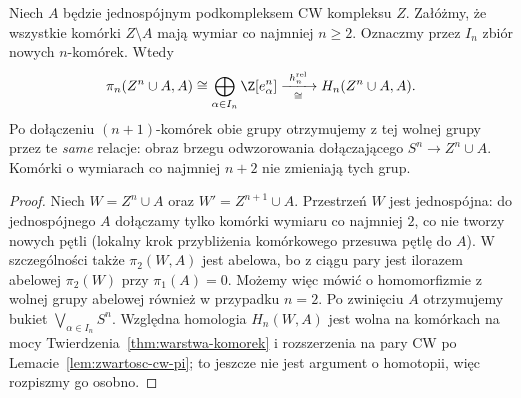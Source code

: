 \begin{lemat}
\label{lem:pierwsze-komorki-pi}
Niech $A$ będzie jednospójnym
podkompleksem CW kompleksu $Z$.
Załóżmy, że wszystkie komórki
$Z\setminus A$ mają wymiar
co najmniej $n\geq2$.
Oznaczmy przez $I_n$
zbiór nowych $n$-komórek.
Wtedy
\[
 \pi_n(Z^n\cup A,A)
 \cong\bigoplus_{\alpha\in I_n}\Z[e_\alpha^n]
 \xrightarrow[\cong]{\ h_n^{\mathrm{rel}}\ }
 H_n(Z^n\cup A,A).
\]
Po dołączeniu $(n+1)$-komórek
obie grupy otrzymujemy
z tej wolnej grupy przez
te \emph{same} relacje:
obraz brzegu odwzorowania
dołączającego $S^n\to
Z^n\cup A$. Komórki
o wymiarach co najmniej
$n+2$ nie zmieniają
tych grup.
\end{lemat}
\begin{proof}
Niech $W=Z^n\cup A$ oraz $W'=Z^{n+1}\cup A$.
Przestrzeń $W$ jest jednospójna: do jednospójnego $A$
dołączamy tylko komórki wymiaru co najmniej $2$, co nie tworzy
nowych pętli (lokalny krok przybliżenia komórkowego przesuwa pętlę do $A$).
W szczególności także $\pi_2(W,A)$ jest abelowa, bo z ciągu pary
jest ilorazem abelowej $\pi_2(W)$ przy $\pi_1(A)=0$.
Możemy więc mówić o homomorfizmie z wolnej grupy abelowej
również w przypadku $n=2$.
Po zwinięciu $A$
otrzymujemy bukiet
$\bigvee_{\alpha\in I_n}S^n$.
Względna homologia
$H_n(W,A)$ jest
wolna na komórkach
na mocy
Twierdzenia~\ref{thm:warstwa-komorek}
i rozszerzenia na pary CW po Lemacie~\ref{lem:zwartosc-cw-pi};
to jeszcze nie jest
argument o homotopii,
więc rozpiszmy go
osobno.


\end{proof}
